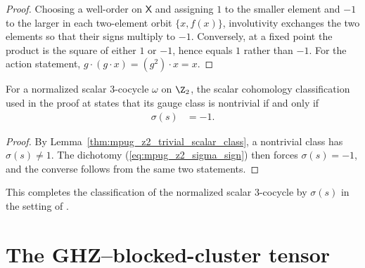 \begin{proof}\leanok
    Choosing a well-order on $\mathsf X$ and assigning $1$ to the smaller
    element and $-1$ to the larger in each two-element orbit $\{x,f(x)\}$,
    involutivity exchanges the two elements so that their signs multiply to
    $-1$. Conversely, at a fixed point the product is the square of either
    $1$ or $-1$, hence equals $1$ rather than $-1$. For the action statement,
    $g\mathbin{\cdot}(g\mathbin{\cdot}x)=(g^2)\mathbin{\cdot}x=x$.
\end{proof}

\begin{lemma}
    \label{thm:mpug_z2_nontrivial_scalar_class}
    \leanok
    For a normalized scalar $3$-cocycle $\omega$ on $\Z_2$, the scalar
    cohomology classification used in the proof at
    \cite[lines~5339--5341]{FrancoRubio2025MPUGauging} states that its gauge
    class is nontrivial if and only if
    \begin{align}
        \sigma(s) & =-1.
        \label{eq:mpug_z2_nontrivial_sigma}
    \end{align}
\end{lemma}

\begin{proof}\leanok
    By Lemma~\ref{thm:mpug_z2_trivial_scalar_class}, a nontrivial class has
    $\sigma(s)\neq1$. The dichotomy
    (\ref{eq:mpug_z2_sigma_sign}) then forces $\sigma(s)=-1$, and the converse
    follows from the same two statements.
\end{proof}

This completes the classification of the normalized scalar $3$-cocycle by
$\sigma(s)$ in the setting of \cite[lines~5207--5338]{FrancoRubio2025MPUGauging}.

\section{The GHZ--blocked-cluster tensor}
\label{sec:mpug_ghz_blocked_cluster}

